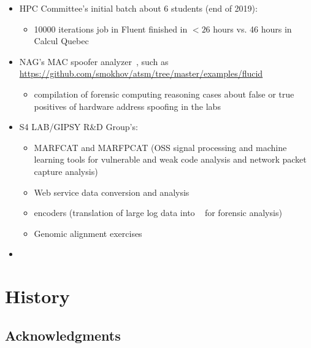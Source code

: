\documentclass{easychair}
\begin{document}
\begin{itemize}
	\item 
HPC Committee's initial batch about 6 students (end of 2019):
\begin{itemize}
	\item 
10000 iterations job in Fluent finished in $<26$ hours vs. 46 hours in Calcul Quebec
\end{itemize}
	\item 
NAG's MAC spoofer analyzer~\cite{mac-spoofer-analyzer-intro-c3s2e2014,mac-spoofer-analyzer-detail-fps2014},
such as \url{https://github.com/smokhov/atsm/tree/master/examples/flucid}
\begin{itemize}
	\item 
compilation of forensic computing reasoning cases about false or true positives of hardware address spoofing in the labs
\end{itemize}
	\item 
S4 LAB/GIPSY R\&D Group's:
\begin{itemize}
	\item 
MARFCAT and MARFPCAT (OSS signal processing and machine learning tools for 
vulnerable and weak code analysis and network packet capture
analysis)~\cite{marfcat-nlp-ai2014,marfcat-sate2010-nist,fingerprinting-mal-traffic}
	\item 
Web service data conversion and analysis
	\item 
{\flucid} encoders (translation of large log data into {\flucid}~\cite{mokhov-phd-thesis-2013} for forensic analysis)
	\item 
Genomic alignment exercises
\end{itemize}
\item
{}
\end{itemize}

\appendix

\section{History}

\subsection{Acknowledgments}
\label{sect:scott-acks}
\end{document}
